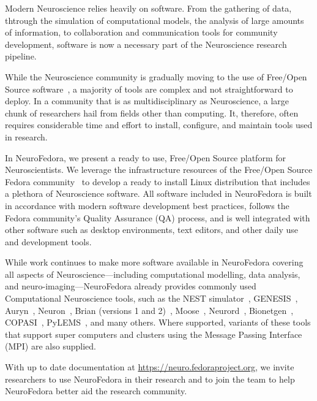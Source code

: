 
Modern Neuroscience relies heavily on software.
From the gathering of data, thtrough the simulation of computational models, the analysis of large amounts of information, to collaboration and communication tools for community development, software is now a necessary part of the Neuroscience research pipeline.

While the Neuroscience community is gradually moving to the use of Free/Open Source software~\cite{Stallman2002,Gleeson2017}, a majority of tools are complex and not straightforward to deploy.
In a community that is as multidisciplinary as Neuroscience, a large chunk of researchers hail from fields other than computing.
It, therefore, often requires considerable time and effort to install, configure, and maintain tools used in research.

In NeuroFedora, we present a ready to use, Free/Open Source platform for Neuroscientists.
We leverage the infrastructure resources of the Free/Open Source Fedora community~\cite{RedHat2008} to develop a ready to install Linux distribution that includes a plethora of Neuroscience software.
All software included in NeuroFedora is built in accordance with modern software development best practices, follows the Fedora community's Quality Assurance (QA) process, and is well integrated with other software such as desktop environments, text editors, and other daily use and development tools.

While work continues to make more software available in NeuroFedora covering all aspects of Neuroscience---including computational modelling, data analysis, and neuro-imaging---NeuroFedora already provides commonly used Computational Neuroscience tools, such as the NEST simulator~\cite{Linssen2018}, GENESIS~\cite{Bower2003}, Auryn~\cite{Zenke2014}, Neuron~\cite{Hines1997}, Brian (versions 1 and 2)~\cite{Goodman2009}, Moose~\cite{Dudani2009}, Neurord~\cite{Jedrzejewski2016}, Bionetgen~\cite{Harris2016}, COPASI~\cite{Mendes2009}, PyLEMS~\cite{Vella2014}, and many others.
Where supported, variants of these tools that support super computers and clusters using the Message Passing Interface (MPI) are also supplied.

With up to date documentation at \url{https://neuro.fedoraproject.org}, we invite researchers to use NeuroFedora in their research and to join the team to help NeuroFedora better aid the research community.
